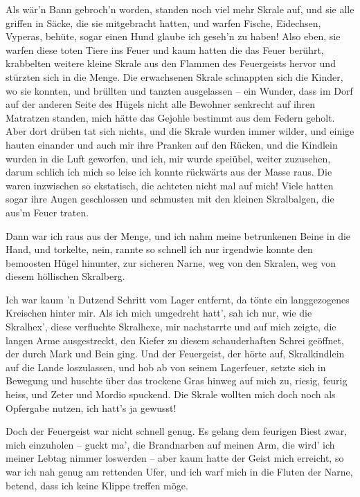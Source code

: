 \documentclass[10pt, a4paper, oneside]{book}
\begin{document}
Als wär’n Bann gebroch’n worden, standen noch viel mehr Skrale auf, und sie alle griffen in Säcke, die sie mitgebracht hatten, und warfen Fische, Eidechsen, Vyperas, behüte, sogar einen Hund glaube ich geseh’n zu haben! Also eben, sie warfen diese toten Tiere ins Feuer und kaum hatten die das Feuer berührt, krabbelten weitere kleine Skrale aus den Flammen des Feuergeists hervor und stürzten sich in die Menge. Die erwachsenen Skrale schnappten sich die Kinder, wo sie konnten, und brüllten und tanzten ausgelassen – ein Wunder, dass im Dorf auf der anderen Seite des Hügels nicht alle Bewohner senkrecht auf ihren Matratzen standen, mich hätte das Gejohle bestimmt aus dem Federn geholt. Aber dort drüben tat sich nichts, und die Skrale wurden immer wilder, und einige hauten einander und auch mir ihre Pranken auf den Rücken, und die Kindlein wurden in die Luft geworfen, und ich, mir wurde speiübel, weiter zuzusehen, darum schlich ich mich so leise ich konnte rückwärts aus der Masse raus. Die waren inzwischen so ekstatisch, die achteten nicht mal auf mich! Viele hatten sogar ihre Augen geschlossen und schmusten mit den kleinen Skralbalgen, die aus’m Feuer traten.

Dann war ich raus aus der Menge, und ich nahm meine betrunkenen Beine in die Hand, und torkelte, nein, rannte so schnell ich nur irgendwie konnte den bemoosten Hügel hinunter, zur sicheren Narne, weg von den Skralen, weg von diesem höllischen Skralberg.

Ich war kaum ’n Dutzend Schritt vom Lager entfernt, da tönte ein langgezogenes Kreischen hinter mir. Als ich mich umgedreht hatt’, sah ich nur, wie die Skralhex’, diese verfluchte Skralhexe, mir nachstarrte und auf mich zeigte, die langen Arme ausgestreckt, den Kiefer zu diesem schauderhaften Schrei geöffnet, der durch Mark und Bein ging. Und der Feuergeist, der hörte auf, Skralkindlein auf die Lande loszulassen, und hob ab von seinem Lagerfeuer, setzte sich in Bewegung und huschte über das trockene Gras hinweg auf mich zu, riesig, feurig heiss, und Zeter und Mordio spuckend. Die Skrale wollten mich doch noch als Opfergabe nutzen, ich hatt’s ja gewusst!

Doch der Feuergeist war nicht schnell genug. Es gelang dem feurigen Biest zwar, mich einzuholen – guckt ma’, die Brandnarben auf meinen Arm, die wird’ ich meiner Lebtag nimmer loswerden – aber kaum hatte der Geist mich erreicht, so war ich nah genug am rettenden Ufer, und ich warf mich in die Fluten der Narne, betend, dass ich keine Klippe treffen möge.
\end{document}
